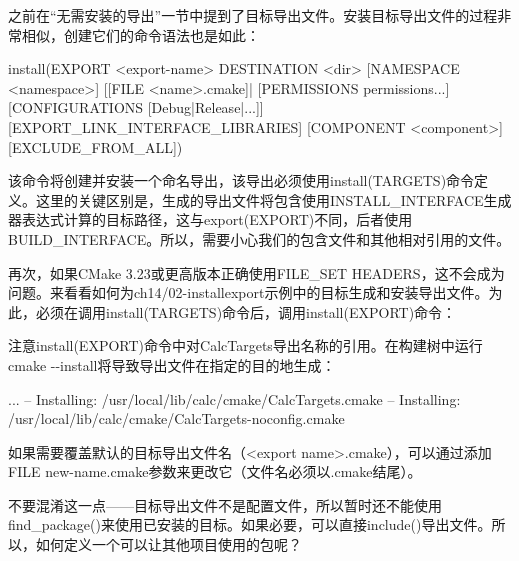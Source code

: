 
之前在“无需安装的导出”一节中提到了目标导出文件。安装目标导出文件的过程非常相似，创建它们的命令语法也是如此：

\begin{cmake}
install(EXPORT <export-name> DESTINATION <dir>
        [NAMESPACE <namespace>] [[FILE <name>.cmake]|
        [PERMISSIONS permissions...]
        [CONFIGURATIONS [Debug|Release|...]]
        [EXPORT_LINK_INTERFACE_LIBRARIES]
        [COMPONENT <component>]
        [EXCLUDE_FROM_ALL])
\end{cmake}

该命令将创建并安装一个命名导出，该导出必须使用install(TARGETS)命令定义。这里的关键区别是，生成的导出文件将包含使用INSTALL\_INTERFACE生成器表达式计算的目标路径，这与export(EXPORT)不同，后者使用BUILD\_INTERFACE。所以，需要小心我们的包含文件和其他相对引用的文件。

再次，如果CMake 3.23或更高版本正确使用FILE\_SET HEADERS，这不会成为问题。来看看如何为ch14/02-installexport示例中的目标生成和安装导出文件。为此，必须在调用install(TARGETS)命令后，调用install(EXPORT)命令：



注意install(EXPORT)命令中对CalcTargets导出名称的引用。在构建树中运行cmake -{}-install将导致导出文件在指定的目的地生成：

\begin{shell}
...
-- Installing: /usr/local/lib/calc/cmake/CalcTargets.cmake
-- Installing: /usr/local/lib/calc/cmake/CalcTargets-noconfig.cmake
\end{shell}

如果需要覆盖默认的目标导出文件名（<export name>.cmake），可以通过添加FILE new-name.cmake参数来更改它（文件名必须以.cmake结尾）。

不要混淆这一点——目标导出文件不是配置文件，所以暂时还不能使用find\_package()来使用已安装的目标。如果必要，可以直接include()导出文件。所以，如何定义一个可以让其他项目使用的包呢？

